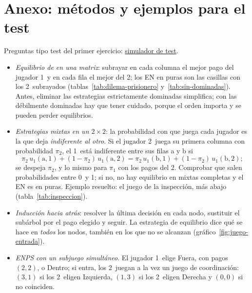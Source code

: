 \documentclass[11pt]{article}
\begin{document}
\clearpage
\appendix

\section{Anexo: métodos y ejemplos para el test}\label{anexo:test}

\begin{anotaciones}
Preguntas tipo test del primer ejercicio: \href{https://www.victorgutierrezmarcos.es/oposicion/temario/primer-ejercicio/test/simulador.html?tema=3.A.14}{simulador de test}.
\end{anotaciones}

\begin{itemize}
\item \emph{Equilibrio de  en una matriz}: subrayar en cada columna el mejor pago del jugador 1~y en cada fila el mejor del 2; los EN en puras son las casillas con los 2~subrayados (tablas~\ref{tab:dilema-prisionero} y~\ref{tab:sin-dominadas}). Antes, eliminar las estrategias estrictamente dominadas simplifica; con las débilmente dominadas hay que tener cuidado, porque el orden importa y se pueden perder equilibrios.
\item \emph{Estrategias mixtas en un $2\times2$}: la probabilidad con que juega cada jugador es la que deja \emph{indiferente al otro}. Si el jugador 2~juega su primera columna con probabilidad $\pi_2$, el 1~está indiferente entre sus filas a y b si
\[
\pi_2\,u_1(\mathrm{a},1)+(1-\pi_2)\,u_1(\mathrm{a},2)=\pi_2\,u_1(\mathrm{b},1)+(1-\pi_2)\,u_1(\mathrm{b},2);
\]
  se despeja $\pi_2$, y lo mismo para $\pi_1$ con los pagos del 2. Comprobar que salen probabilidades entre 0~y 1; si no, no hay equilibrio en mixtas completas y el EN es en puras. Ejemplo resuelto: el juego de la inspección, más abajo (tabla~\ref{tab:inspeccion}).
\item \emph{Inducción hacia atrás}: resolver la última decisión en cada nodo, sustituir el subárbol por el pago elegido y seguir. La estrategia de equilibrio dice qué se hace en \emph{todos} los nodos, también en los que no se alcanzan (gráfico~\ref{fig:juego-entrada}).
\item \emph{ENPS con un subjuego simultáneo}. El jugador 1~elige Fuera, con pagos $(2,2)$, o Dentro; si entra, los 2~juegan a la vez un juego de coordinación: $(3,1)$ si los 2~eligen Izquierda, $(1,3)$ si los 2~eligen Derecha y $(0,0)$ si no coinciden.
  \begin{itemize}

\end{itemize}
\end{itemize}
\end{document}
